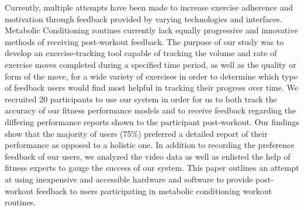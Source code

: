 Currently, multiple attempts have been made to increase exercise adherence and motivation through feedback provided by varying technologies and interfaces.  Metabolic Conditioning routines currently lack equally progressive and innovative methods of receiving post-workout feedback.  The purpose of our study was to develop an exercise-tracking tool capable of tracking the volume and rate of exercise moves completed during a specified time period, as well as the quality or form of the move, for a wide variety of exercises in order to determine which type of feedback users would find most helpful in tracking their progress over time.  We recruited 20 participants to use our system in order for us to both track the accuracy of our fitness performance models and to receive feedback regarding the differing performance reports shown to the participant post-workout.  Our findings show that the majority of users (75\%) preferred a detailed report of their performance as opposed to a holistic one.  In addition to recording the preference feedback of our users, we analyzed the video data as well as enlisted the help of fitness experts to gauge the success of our system.  This paper outlines an attempt at using inexpensive and accessible hardware and software to provide post-workout feedback to users participating in metabolic conditioning workout routines.